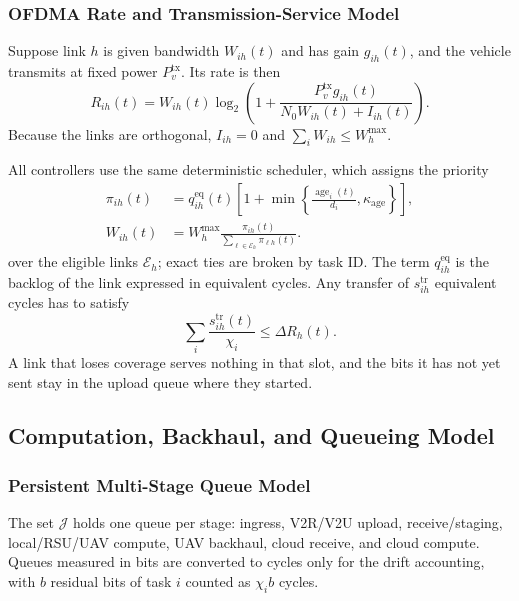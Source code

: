 \subsubsection{OFDMA Rate and Transmission-Service Model}
Suppose link $h$ is given bandwidth $W_{ih}(t)$ and has gain $g_{ih}(t)$,
and the vehicle transmits at fixed power $P_v^{\mathrm{tx}}$. Its rate is
then
\begin{equation}
R_{ih}(t)=W_{ih}(t)\log_2\!\left(
1+\frac{P_v^{\mathrm{tx}}g_{ih}(t)}
{N_0W_{ih}(t)+I_{ih}(t)}\right).
\label{eq:rate}
\end{equation}
Because the links are orthogonal, $I_{ih}=0$ and
$\sum_iW_{ih}\le W_h^{\max}$.

All controllers use the same deterministic scheduler, which assigns the
priority
\begin{equation}
\begin{aligned}
\pi_{ih}(t)&=q_{ih}^{\mathrm{eq}}(t)
\left[1+\min\left\{\frac{\operatorname{age}_i(t)}{d_i},
\kappa_{\mathrm{age}}\right\}\right],\\
W_{ih}(t)&=W_h^{\max}
\frac{\pi_{ih}(t)}{\sum_{\ell\in\mathcal E_h}\pi_{\ell h}(t)}.
\end{aligned}
\label{eq:ofdma}
\end{equation}
over the eligible links $\mathcal E_h$; exact ties are broken by task ID.
The term $q_{ih}^{\mathrm{eq}}$ is the backlog of the link expressed in
equivalent cycles. Any transfer of $s_{ih}^{\mathrm{tr}}$ equivalent cycles
has to satisfy
\begin{equation}
\sum_i\frac{s_{ih}^{\mathrm{tr}}(t)}{\chi_i}
\le\Delta R_h(t).
\label{eq:radio_capacity}
\end{equation}
A link that loses coverage serves nothing in that slot, and the bits it has
not yet sent stay in the upload queue where they started.

\subsection{Computation, Backhaul, and Queueing Model}
\subsubsection{Persistent Multi-Stage Queue Model}
The set $\mathcal J$ holds one queue per stage: ingress, V2R/V2U upload,
receive/staging, local/RSU/UAV compute, UAV backhaul, cloud receive, and
cloud compute. Queues measured in bits are converted to cycles only for the
drift accounting, with $b$ residual bits of task $i$ counted as $\chi_i b$
cycles.

